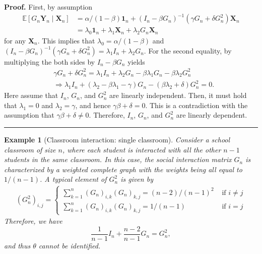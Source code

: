 \documentclass[10.5pt, A4paper, openany, uplatex]{book}
\newcommand{\mbf}{\mathbf}
\newcommand{\E}{\mathbb{E}}
\newtheorem{example}[theorem]{Example}
\newenvironment{proof}[1][Proof]{\textbf{#1.} }{\  \rule{0.5em}{0.5em}}
\numberwithin{equation}{section}
\begin{document}
\begin{proof}
	First, by assumption
	\begin{align*}
		\E[G_n \mbf{Y}_n \mid \mbf{X}_n] 
		& = \alpha/(1 - \beta) \mathbf{1}_n  + (I_n - \beta G_n)^{-1}( \gamma G_n + \delta G_n^2 ) \mbf{X}_n\\
		& =  \lambda_0\mbf{1}_n + \lambda_1\mbf{X}_n + \lambda_2 G_n \mbf{X}_n
	\end{align*}
	for any $\mbf{X}_n$.
	This implies that $\lambda_0 = \alpha/(1 - \beta)$ and $(I_n - \beta G_n)^{-1}( \gamma G_n + \delta G_n^2 ) = \lambda_1 I_n + \lambda_2 G_n$.
	For the second equality, by multiplying the both sides by $I_n - \beta G_n$ yields
	\begin{align*}
		& \gamma G_n + \delta G_n^2  = \lambda_1 I_n + \lambda_2 G_n -  \beta \lambda_1 G_n - \beta \lambda_2 G_n^2 \\
		& \Longrightarrow \lambda_1 I_n + (\lambda_2 - \beta \lambda_1 - \gamma) G_n - (\beta \lambda_2 + \delta) G_n^2 = 0.
	\end{align*}
	Here assume that $I_n$, $G_n$, and $G_n^2$ are linearly independent.
	Then, it must hold that $\lambda_1 = 0$ and $\lambda_2 = \gamma$, and hence $\gamma \beta + \delta = 0$.
	This is a contradiction with the assumption that $\gamma \beta + \delta \neq 0$.
	Therefore, $I_n$, $G_n$, and $G_n^2$ are linearly dependent.
\end{proof}

\begin{example}[Classroom interaction: single classroom]\upshape
	Consider a school classroom of size $n$, where each student is interacted with all the other $n-1$ students in the same classroom.
	In this case, the social interaction matrix $G_n$ is characterized by a weighted complete graph with the weights being all equal to $1/(n - 1)$.
	A typical element of $G_n^2$ is given by
	\begin{align*}
		(G_n^2)_{i,j} = \left\{\begin{array}{ll}
		\sum_{k = 1} ^n (G_n)_{i,k} (G_n)_{k,j} = (n - 2)/(n-1)^2& \text{ if $i \neq j$} \\
		\sum_{k = 1} ^n (G_n)_{i,k} (G_n)_{k,j} = 1/(n-1)& \text{ if $i = j$}
		\end{array}\right.
	\end{align*}
	Therefore, we have
	\[
	\frac{1}{n - 1} I_n + \frac{n-2}{n-1} G_n = G_n^2,
	\]
	and thus $\theta$ cannot be identified.
\end{example}
\end{document}
